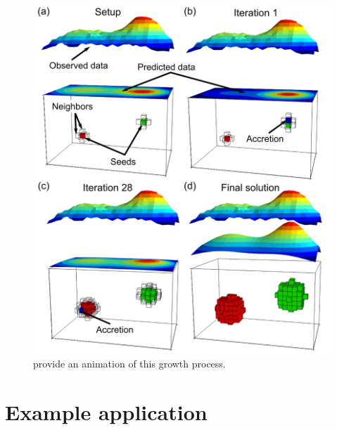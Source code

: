 \documentclass[twocolumn,final]{svjour3}
\begin{document}
\begin{figure}
    \includegraphics{fig/method}
    \caption{\citet{uieda_animation} provide an animation of this growth
    process.}
    \label{fig:method}
\end{figure}

\section{Example application}

\begin{sloppypar}
\end{sloppypar}

\end{document}
